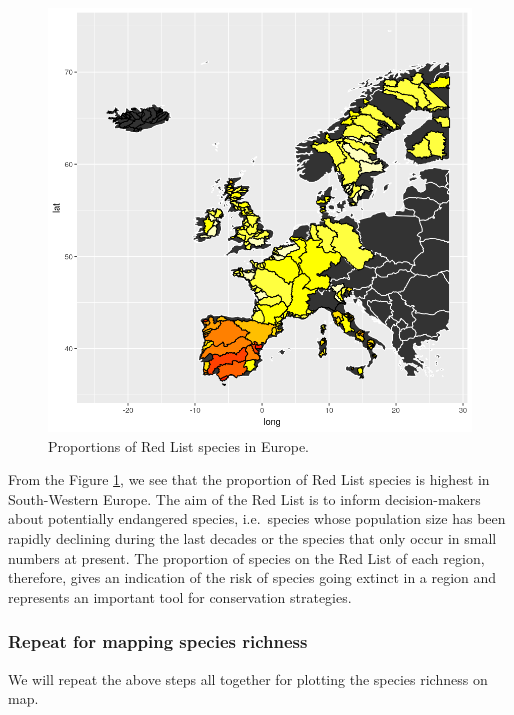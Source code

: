 \documentclass[
]{book}
\begin{document}
\begin{figure}
\includegraphics[width=11.67in]{./figures/output_201_0} \caption{Proportions of Red List species in Europe.}\label{fig:europe2}
\end{figure}

From the Figure \ref{fig:europe2}, we see that the proportion of Red List species is highest in South-Western Europe. The aim of the Red List is to inform decision-makers about potentially endangered species, i.e.~species whose population size has been rapidly declining during the last decades or the species that only occur in small numbers at present. The proportion of species on the Red List of each region, therefore, gives an indication of the risk of species going extinct in a region and represents an important tool for conservation strategies.

\hypertarget{repeat-for-mapping-species-richness}{%
\subsubsection*{Repeat for mapping species richness}\label{repeat-for-mapping-species-richness}}

We will repeat the above steps all together for plotting the species richness on map.
\end{document}
